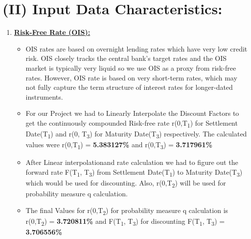 \documentclass[12pt,a4paper]{article}
\begin{document}
\section*{(II) Input Data Characteristics:}
\begin{enumerate}
\item \underline{\textbf{Risk-Free Rate (OIS):}}
	\begin{itemize}
	\item  OIS rates are based on overnight lending rates which have very low credit risk. OIS closely tracks the central bank's target rates and the OIS market is typically very liquid so we use OIS as a proxy from risk-free rates. However, OIS rate is based on very short-term rates, which may not fully capture the term structure of interest rates for longer-dated instruments.
	\item For our Project we had to Linearly Interpolate the Discount Factors to get the continuously compounded Risk-free rate r(0,T\textsubscript{1}) for Settlement Date(T\textsubscript{1}) and  r(0, T\textsubscript{3}) for Maturity Date(T\textsubscript{3}) respectively. The calculated values were r(0,T\textsubscript{1}) = \textbf{5.383127\%} and r(0,T\textsubscript{3}) = \textbf{3.717961\%}
	\item After Linear interpolationand rate calculation we had to figure out the forward rate F(T\textsubscript{1}, T\textsubscript{3}) from Settlement Date(T\textsubscript{1}) to Maturity Date(T\textsubscript{3}) which would be used for discounting. Also, r(0,T\textsubscript{2}) will be used for probability measure q calculation.
	\item The final Values for  r(0,T\textsubscript{2})  for probability measure q calculation is r(0,T\textsubscript{2}) = \textbf{3.720811\%} and  F(T\textsubscript{1}, T\textsubscript{3}) for discounting  F(T\textsubscript{1}, T\textsubscript{3}) = \textbf{3.706556\%}
	\end{itemize}


\end{enumerate}
\end{document}
